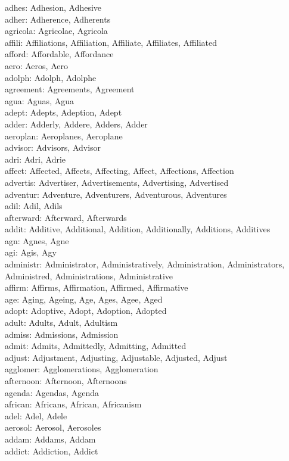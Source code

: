 adhes: Adhesion, Adhesive\\
adher: Adherence, Adherents\\
agricola: Agricolae, Agricola\\
affili: Affiliations, Affiliation, Affiliate, Affiliates, Affiliated\\
afford: Affordable, Affordance\\
aero: Aeros, Aero\\
adolph: Adolph, Adolphe\\
agreement: Agreements, Agreement\\
agua: Aguas, Agua\\
adept: Adepts, Adeption, Adept\\
adder: Adderly, Addere, Adders, Adder\\
aeroplan: Aeroplanes, Aeroplane\\
advisor: Advisors, Advisor\\
adri: Adri, Adrie\\
affect: Affected, Affects, Affecting, Affect, Affections, Affection\\
advertis: Advertiser, Advertisements, Advertising, Advertised\\
adventur: Adventure, Adventurers, Adventurous, Adventures\\
adil: Adil, Adils\\
afterward: Afterward, Afterwards\\
addit: Additive, Additional, Addition, Additionally, Additions, Additives\\
agn: Agnes, Agne\\
agi: Agis, Agy\\
administr: Administrator, Administratively, Administration, Administrators, Administred, Administrations, Administrative\\
affirm: Affirms, Affirmation, Affirmed, Affirmative\\
age: Aging, Ageing, Age, Ages, Agee, Aged\\
adopt: Adoptive, Adopt, Adoption, Adopted\\
adult: Adults, Adult, Adultism\\
admiss: Admissions, Admission\\
admit: Admits, Admittedly, Admitting, Admitted\\
adjust: Adjustment, Adjusting, Adjustable, Adjusted, Adjust\\
agglomer: Agglomerations, Agglomeration\\
afternoon: Afternoon, Afternoons\\
agenda: Agendas, Agenda\\
african: Africans, African, Africanism\\
adel: Adel, Adele\\
aerosol: Aerosol, Aerosoles\\
addam: Addams, Addam\\
addict: Addiction, Addict\\


